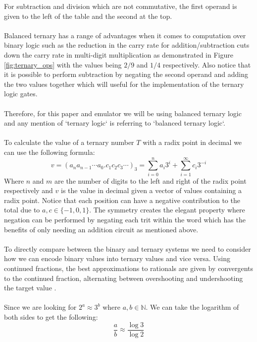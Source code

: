 \documentclass[12pt]{article}
\begin{document}
For subtraction and division which are not commutative, the first operand is given to the left of the table and the second at the top.\\
\\
Balanced ternary has a range of advantages when it comes to computation over binary logic such as the reduction in the carry rate for 
addition/subtraction cuts down the carry rate in multi-digit multiplication as demonstrated in Figure \ref{fig:ternary_ops} with 
the values being $2/9$ and $1/4$ respectively. Also notice that it is possible to perform subtraction by negating the second operand and 
adding the two values together which will useful for the implementation of the ternary logic gates.\\
\\
Therefore, for this paper and emulator we will be using balanced ternary logic and any mention of `ternary logic` is referring to 
`balanced ternary logic`.\\
\\
To calculate the value of a ternary number $T$ with a radix point in decimal we can use the following formula:\\
\begin{equation}
    v = (a_{n}a_{n-1} \dotsb a_{0}.c_{1}c_{2}c_{3} \dotsb)_3 = \sum_{i=0}^{n} a_{i} 3^{i} + \sum_{i=1}^{\infty} c_{i} 3^{-i}
\end{equation}
Where $n$ and $m$ are the number of digits to the left and right of the radix point respectively and $v$ is the value in decimal given 
a vector of values containing a radix point. Notice that each position can have a negative contribution to the total due 
to $a,c \in \{ -1, 0, 1 \}$. The symmetry creates the elegant property where negation can be performed by negating each 
trit within the word which has the benefits of only needing an addition circuit as mentioned above.\\
\\
To directly compare between the binary and ternary systems we need to consider how we can encode binary values into ternary values and 
vice versa. Using continued fractions, the best approximations to rationals are given by convergents to the continued fraction, 
alternating between overshooting and undershooting the target value \citep{davenport2008arithmetic}.\\
\\
Since we are looking for $2^{a} \approx 3^{b}$ where $a,b \in \mathbb{N}$. We can take the logarithm of both sides to get the following:
\begin{equation}
    \frac{a}{b} \approx \frac{\log 3}{\log 2}
\end{equation}
\end{document}
